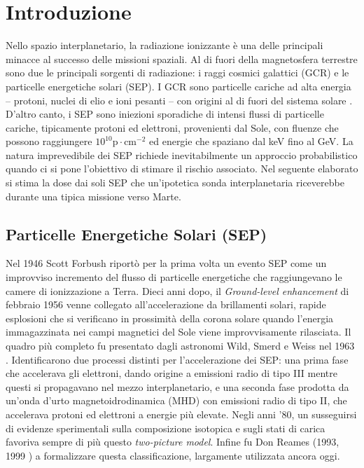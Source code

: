 \documentclass[12pt]{report}
\begin{document}
\clearpage
\setcounter{page}{1}






\chapter{Introduzione}
Nello spazio interplanetario, la radiazione ionizzante è una delle principali minacce al successo delle missioni spaziali. Al di fuori della magnetosfera terrestre sono due le principali sorgenti di radiazione: i raggi cosmici galattici (GCR) e le particelle energetiche solari (SEP). I GCR sono particelle cariche ad alta energia -- protoni, nuclei di elio e ioni pesanti -- con origini al di fuori del sistema solare \cite{Prantzos2012}. D'altro canto, i SEP sono iniezioni sporadiche di intensi flussi di particelle cariche, tipicamente protoni ed elettroni, provenienti dal Sole, con fluenze che possono raggiungere $10^{10} \text{p}\cdot\text{cm}^{-2}$ \cite{Wang2024} ed energie che spaziano dal keV fino al GeV.
La natura imprevedibile dei SEP richiede inevitabilmente un approccio probabilistico quando ci si pone l’obiettivo di stimare il rischio associato. Nel seguente elaborato si stima la dose dai soli SEP che un'ipotetica sonda interplanetaria riceverebbe durante una tipica missione verso Marte.





\section{Particelle Energetiche Solari (SEP)}
Nel 1946 Scott Forbush \cite{PhysRev.70.771} riportò per la prima volta un evento SEP come un improvviso incremento del flusso di particelle energetiche che raggiungevano le camere di ionizzazione a Terra. Dieci anni dopo, il \textit{Ground-level enhancement} di febbraio 1956 \cite{Cliver_2008} venne collegato all'accelerazione da brillamenti solari, rapide esplosioni che si verificano in prossimità della corona solare quando l'energia immagazzinata nei campi magnetici del Sole viene improvvisamente rilasciata. Il quadro più completo fu presentato dagli astronomi Wild, Smerd e Weiss nel 1963 \cite{Wild1963}. Identificarono due processi distinti per l'accelerazione dei SEP: una prima fase che accelerava gli elettroni, dando origine a emissioni radio di tipo III mentre questi si propagavano nel mezzo interplanetario, e una seconda fase prodotta da un'onda d'urto magnetoidrodinamica (MHD) con emissioni radio di tipo II, che accelerava protoni ed elettroni a energie più elevate.
Negli anni '80, un susseguirsi di evidenze sperimentali sulla composizione isotopica \cite{cook1981elemental} e sugli stati di carica \cite{breneman1985solar} favoriva sempre di più questo \textit{two-picture model}. Infine fu Don Reames (1993, 1999 \cite{Reames1999}) a formalizzare questa classificazione, largamente utilizzata ancora oggi.
\end{document}
